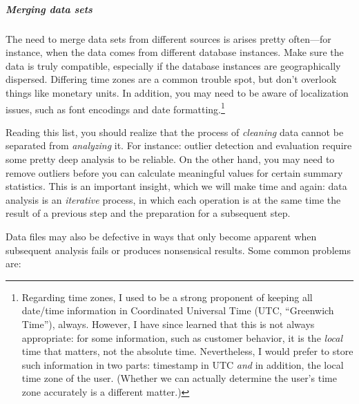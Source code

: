 \begin{unnumlist}
\subparagraph{Merging data sets} 
\item The need to merge data sets from different  
  sources is arises pretty often---for instance, when the data comes
  from different database instances. Make sure the data is truly
  compatible, especially if the database instances are geographically
  dispersed.  Differing time zones are a common trouble spot, but don't
  overlook things like monetary units.  In addition, you may need to
  be aware of localization issues, such as font encodings and date
  formatting.\footnote{Regarding time zones, I used to be a strong
    proponent of keeping all date/time information in Coordinated Universal Time
     (UTC, ``Greenwich Time''), always. However, I have
    since learned that this is not always appropriate: for some
    information, such as customer behavior, it is the \emph{local}
    time that matters, not the absolute time. Nevertheless, I would
    prefer to store such information in two parts: timestamp in UTC
    \emph{and} in addition, the local time zone of the user.  (Whether
    we can actually determine the user's time zone accurately is a
    different matter.)}
\end{unnumlist}

Reading this list, you should realize that the process of
\emph{cleaning} data cannot be separated from \emph{analyzing} it.
For instance: outlier detection and evaluation require some pretty
deep analysis to be reliable. On the other hand, you may need to
remove outliers before you can calculate meaningful values for certain
summary statistics. This is an important insight, which we will make
time and again: data analysis is an \emph{iterative} process, in which
each operation is at the same time the result of a previous step and
the preparation for a subsequent step.

Data files may also be defective in ways that only become apparent
when subsequent analysis fails or produces nonsensical results. Some
common problems are:

